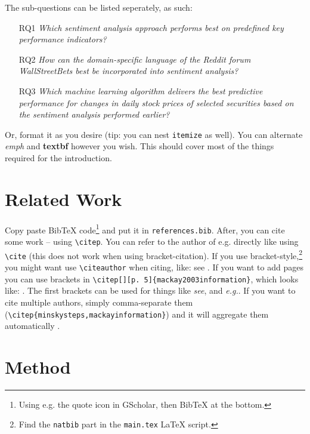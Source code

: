 \documentclass[11pt, a4paper]{article}
\begin{document}
\noindent The sub-questions can be listed seperately, as such:

\begin{itemize}
    \item[RQ1] \emph{Which sentiment analysis approach performs best on predefined key performance indicators?}
    \item[RQ2] \emph{How can the domain-specific language of the Reddit forum WallStreetBets best be incorporated into sentiment analysis?}
    \item[RQ3] \emph{Which machine learning algorithm delivers the best predictive performance for changes in daily stock prices of selected securities based on the sentiment analysis performed earlier?}
\end{itemize}

\noindent Or, format it as you desire (tip: you can nest \texttt{itemize} as well). You can alternate \emph{emph} and \textbf{textbf} however you wish. This should cover most of the things required for the introduction.

\section{Related Work}

Copy paste BibTeX code\footnote{Using e.g. the quote icon in GScholar, then BibTeX at the bottom.} and put it in \texttt{references.bib}. After, you can cite some work \citep{mackay2003information} -- using \texttt{\textbackslash citep}. You can refer to the author of e.g. \cite{minsky1961steps} directly like using \texttt{\textbackslash cite} (this does not work when using bracket-citation). If you use bracket-style,\footnote{Find the \texttt{natbib} part in the \texttt{main.tex} \LaTeX{} script.} you might want use \texttt{\textbackslash citeauthor} when citing, like: see \citeauthor{danbot2015InvestorSentiment} \cite{danbot2015InvestorSentiment}.  If you want to add pages you can use brackets in \texttt{\textbackslash citep[][p. 5]\{mackay2003information\}}, which looks like: \citep[][p. 5]{mackay2003information}. The first brackets can be used for things like \emph{see}, and \emph{e.g.}. If you want to cite multiple authors, simply comma-separate them (\texttt{\textbackslash citep\{\-minsky\-steps,\-mackay\-information\}}) and it will aggregate them automatically \citep{minsky1961steps}.

\section{Method}
\end{document}
